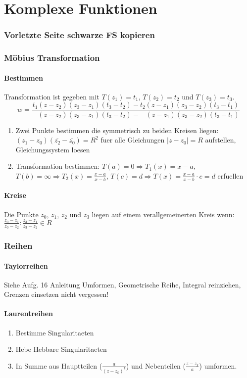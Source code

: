 \documentclass[10pt,a4paper]{article}
\begin{document}
\part*{Komplexe Funktionen}

\section{Vorletzte Seite schwarze FS kopieren}

\section{Möbius Transformation}
\subsection{Bestimmen}
Transformation ist gegeben mit $T(z_1)=t_1$, $T(z_2)=t_2$ und $T(z_3)=t_3$.
\[w = \frac{
t_1(z-z_2)(z_3-z_1)(t_3-t_2) - t_2(z-z_1)(z_3-z_2)(t_3-t_1)
}{
\,\,\,\,\,(z-z_2)(z_3-z_1)(t_3-t_2) - \,\,\,\,\,(z-z_1)(z_3-z_2)(t_3-t_1)
}\]
\begin{enumerate}
\item Zwei Punkte bestimmen die symmetrisch zu beiden Kreisen liegen: $(z_1 - z_0)(\overline{z_2} - \overline{z_0}) = R^2$ fuer alle Gleichungen $|z - z_0| = R$ aufstellen, Gleichungssystem loesen
\item Transformation bestimmen: $T(a) = 0 \Rightarrow T_1(x) = x - a$, $T(b) = \infty \Rightarrow T_2(x) = \frac{x-a}{x-b}$, $T(c) = d \Rightarrow T(x) = \frac{x-a}{x-b} \cdot e = d$ erfuellen
\end{enumerate}
\subsection{Kreise}
Die Punkte $z_0$, $z_1$, $z_2$ und $z_3$ liegen auf einem verallgemeinerten Kreis wenn:
$\frac{z_0-z_1}{z_0-z_2} : \frac{z_3-z_1}{z_3-z_2} \in R$

\section{Reihen}
\subsection{Taylorreihen}
Siehe Aufg. 16 Anleitung
Umformen, Geometrische Reihe, Integral reinziehen, Grenzen einsetzen nicht vergessen!


\subsection{Laurentreihen}
\begin{enumerate}
\item Bestimme Singularitaeten
\item Hebe Hebbare Singularitaeten
\item In Summe aus Hauptteilen ($ \frac{a}{(z-z_k)^k}$) und Nebenteilen ($ \frac{z-z_k}{a}$) umformen.
\end{enumerate}
\end{document}

